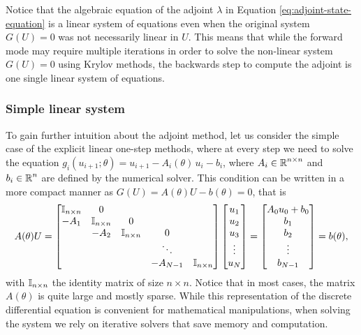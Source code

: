 Notice that the algebraic equation of the adjoint $\lambda$ in Equation \eqref{eq:adjoint-state-equation} is a linear system of equations even when the original system $G(U)=0$ was not necessarily linear in $U$.
This means that while the forward mode may require multiple iterations in order to solve the non-linear system $G(U) = 0$ using Krylov methods, the backwards step to compute the adjoint is one single linear system of equations. 

\subsubsection{Simple linear system}

To gain further intuition about the adjoint method, let us consider the simple case of the explicit linear one-step methods, where at every step we need to solve the equation $g_i (u_{i+1}; \theta) = u_{i+1} - A_i (\theta) \, u_i - b_i$, where $A_i \in \operatorname{\mathbb{R}}^{n \times n}$ and $b_i \in \operatorname{\mathbb{R}}^n$ are defined by the numerical solver. 
This condition can be written in a more compact manner as $G(U)=A(\theta) U - b(\theta) = 0$, that is 
\begin{equation}
    A(\theta) U 
    = 
    \begin{bmatrix}
        \operatorname{\mathbb{I}}_{n \times n} & 0 &   &  & \\
        -A_1 & \operatorname{\mathbb{I}}_{n \times n} & 0 &  &  \\
          & -A_2 & \operatorname{\mathbb{I}}_{n \times n} & 0 &  \\
         &  &   & \ddots &   \\
         &  &  & -A_{N-1} & \operatorname{\mathbb{I}}_{n \times n}
    \end{bmatrix}
    \begin{bmatrix}
        u_1 \\
        u_2 \\
        u_3 \\
        \vdots \\
        u_N
    \end{bmatrix}
    = 
    \begin{bmatrix}
        A_0 u_0 + b_0 \\
        b_1 \\
        b_2 \\
        \vdots \\
        b_{N-1}
    \end{bmatrix}
    = 
    b(\theta), 
\end{equation}
with $\operatorname{\mathbb{I}}_{n \times n}$ the identity matrix of size $n \times n$.
Notice that in most cases, the matrix $A(\theta)$ is quite large and mostly sparse. 
While this representation of the discrete differential equation is  convenient for mathematical manipulations, when solving the system we rely on iterative solvers that save memory and computation. 

